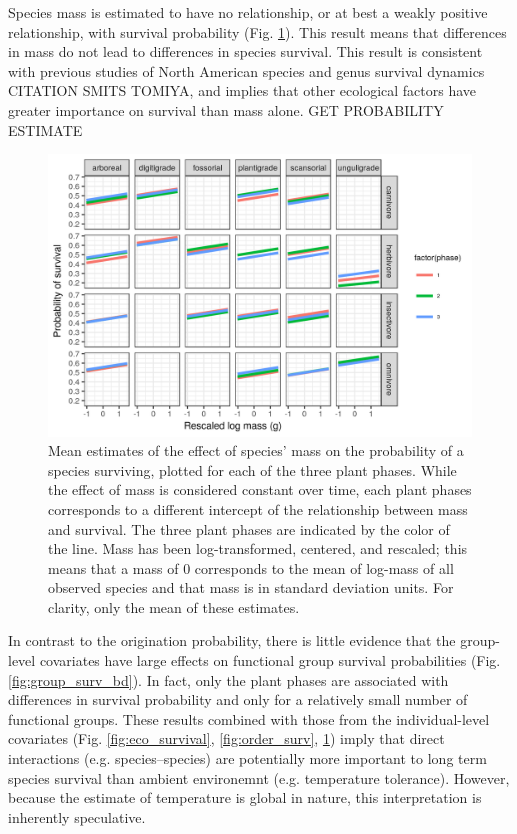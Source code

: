 \documentclass[12pt,letterpaper]{article}
\begin{document}
Species mass is estimated to have no relationship, or at best a weakly positive relationship, with survival probability (Fig. \ref{fig:mass_survival}). This result means that differences in mass do not lead to differences in species survival. This result is consistent with previous studies of North American species and genus survival dynamics CITATION SMITS TOMIYA, and implies that other ecological factors have greater importance on survival than mass alone. \uppercase{get probability estimate}
\begin{figure}[ht]
  \centering
  \includegraphics[width=\textwidth,height=0.4\textheight,keepaspectratio=true]{figure/mass_on_surv_bd}
  \caption{Mean estimates of the effect of species' mass on the probability of a species surviving, plotted for each of the three plant phases. While the effect of mass is considered constant over time, each plant phases corresponds to a different intercept of the relationship between mass and survival. The three plant phases are indicated by the color of the line. Mass has been log-transformed, centered, and rescaled; this means that a mass of 0 corresponds to the mean of log-mass of all observed species and that mass is in standard deviation units. For clarity, only the mean of these estimates.}
  \label{fig:mass_survival}
\end{figure}

In contrast to the origination probability, there is little evidence that the group-level covariates have large effects on functional group survival probabilities (Fig. \ref{fig:group_surv_bd}). In fact, only the plant phases are associated with differences in survival probability and only for a relatively small number of functional groups. These results combined with those from the individual-level covariates (Fig. \ref{fig:eco_survival}, \ref{fig:order_surv}, \ref{fig:mass_survival}) imply that direct interactions (e.g. species--species) are potentially more important to long term species survival than ambient environemnt (e.g. temperature tolerance). However, because the estimate of temperature is global in nature, this interpretation is inherently speculative.
\end{document}
